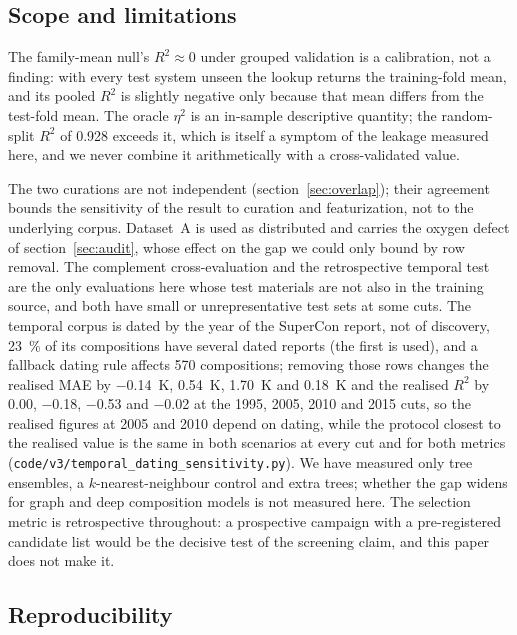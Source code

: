 \documentclass{iopjournal}
\newcommand{\Rsq}{R^{2}}
\begin{document}
\subsection{Scope and limitations}

The family-mean null's $\Rsq \approx 0$ under grouped validation is a calibration, not a finding:
with every test system unseen the lookup returns the training-fold mean, and its pooled $\Rsq$ is
slightly negative only because that mean differs from the test-fold mean. The oracle $\eta^2$ is an
in-sample descriptive quantity; the random-split $\Rsq$ of \num{0.928} exceeds it, which is itself a
symptom of the leakage measured here, and we never combine it arithmetically with a cross-validated
value.

The two curations are not independent (section~\ref{sec:overlap}); their agreement bounds the
sensitivity of the result to curation and featurization, not to the underlying corpus. Dataset~A is
used as distributed and carries the oxygen defect of section~\ref{sec:audit}, whose effect on the
gap we could only bound by row removal. The complement cross-evaluation and the retrospective temporal test
are the only evaluations here whose test materials are not also in the training source, and both
have small or unrepresentative test sets at some cuts. The temporal corpus is dated by the year of
the SuperCon report, not of discovery, \SI{23}{\percent} of its compositions have several dated
reports (the first is used), and a fallback dating rule affects \num{570} compositions; removing those rows changes the realised MAE by \SI{-0.14}{\kelvin}, \SI{+0.54}{\kelvin}, \SI{+1.70}{\kelvin} and \SI{+0.18}{\kelvin} and the realised $\Rsq$ by \num{+0.00}, \num{-0.18}, \num{-0.53} and \num{-0.02} at the 1995, 2005, 2010 and 2015 cuts, so the realised figures at 2005 and 2010 depend on dating, while the protocol closest to the realised value is the same in both scenarios at every cut and for both metrics (\texttt{code/v3/temporal\_dating\_sensitivity.py}). We have measured only tree
ensembles, a $k$-nearest-neighbour control and extra trees; whether the gap widens for graph and
deep composition models is not measured here. The selection metric is retrospective throughout: a
prospective campaign with a pre-registered candidate list would be the decisive test of the
screening claim, and this paper does not make it.

\subsection{Reproducibility}
\label{sec:repro}
\end{document}
